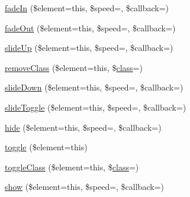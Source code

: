 \begin{DoxyCompactItemize}
\item 
\mbox{\hyperlink{class_c_i___javascript_ac4255e434413b0b439e6ecd2d19f54d1}{fade\+In}} (\$element=\textquotesingle{}this\textquotesingle{}, \$speed=\textquotesingle{}\textquotesingle{}, \$callback=\textquotesingle{}\textquotesingle{})
\item 
\mbox{\hyperlink{class_c_i___javascript_a7d2f81e611696887be4f8a1edeb55bd4}{fade\+Out}} (\$element=\textquotesingle{}this\textquotesingle{}, \$speed=\textquotesingle{}\textquotesingle{}, \$callback=\textquotesingle{}\textquotesingle{})
\item 
\mbox{\hyperlink{class_c_i___javascript_a3d94535f1d68c62698e733d34152d1f9}{slide\+Up}} (\$element=\textquotesingle{}this\textquotesingle{}, \$speed=\textquotesingle{}\textquotesingle{}, \$callback=\textquotesingle{}\textquotesingle{})
\item 
\mbox{\hyperlink{class_c_i___javascript_a909e52e0a7e3ddd7e6520965618d50f4}{remove\+Class}} (\$element=\textquotesingle{}this\textquotesingle{}, \$\mbox{\hyperlink{waiter_2olaporan_8php_a185c73c6507391d1eb38c776b68ce96d}{class}}=\textquotesingle{}\textquotesingle{})
\item 
\mbox{\hyperlink{class_c_i___javascript_a252f34441b5adb1b8bec1aa93b4140e1}{slide\+Down}} (\$element=\textquotesingle{}this\textquotesingle{}, \$speed=\textquotesingle{}\textquotesingle{}, \$callback=\textquotesingle{}\textquotesingle{})
\item 
\mbox{\hyperlink{class_c_i___javascript_a7919ca63a6371117a366baacd6412491}{slide\+Toggle}} (\$element=\textquotesingle{}this\textquotesingle{}, \$speed=\textquotesingle{}\textquotesingle{}, \$callback=\textquotesingle{}\textquotesingle{})
\item 
\mbox{\hyperlink{class_c_i___javascript_ace07091981f312c3be8238f08815142c}{hide}} (\$element=\textquotesingle{}this\textquotesingle{}, \$speed=\textquotesingle{}\textquotesingle{}, \$callback=\textquotesingle{}\textquotesingle{})
\item 
\mbox{\hyperlink{class_c_i___javascript_aea72ca9a9b57e1cae194f84dbcb30d70}{toggle}} (\$element=\textquotesingle{}this\textquotesingle{})
\item 
\mbox{\hyperlink{class_c_i___javascript_ab3f471c0411b110bc11f62fa26e9a9e3}{toggle\+Class}} (\$element=\textquotesingle{}this\textquotesingle{}, \$\mbox{\hyperlink{waiter_2olaporan_8php_a185c73c6507391d1eb38c776b68ce96d}{class}}=\textquotesingle{}\textquotesingle{})
\item 
\mbox{\hyperlink{class_c_i___javascript_a37f187e47112ada2d8ffe4c840556178}{show}} (\$element=\textquotesingle{}this\textquotesingle{}, \$speed=\textquotesingle{}\textquotesingle{}, \$callback=\textquotesingle{}\textquotesingle{})

\end{DoxyCompactItemize}
